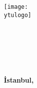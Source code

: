 \onehalfspacing
{}


\begin{titlepage}
    \begin{center}
    
        \large
        
        \textbf{\country\\ \university \\ \MakeUppercase\faculty}
        
        \texttt{[image: \\ytulogo]}

        \vspace*{1.5cm}
        \Large
        
        \parbox[][1cm][c]{1.0\textwidth}{
            \centering
            \textbf{\titleOfThesis}
        }
        
        \vspace{3cm}
        
        \textbf{\student \hspace{0.5cm} \studentno}
        \ifx\studentii\empty\else{\textbf{\\ \studentii \hspace{0.5cm} \studentiino} } \fi
        \ifx\studentiii\empty\else{\textbf{\\ \studentiii \hspace{0.5cm} \studentiiino} } \fi
        \ifx\studentiv\empty\else{\textbf{\\ \studentiv \hspace{0.5cm} \studentivno} } \fi

        
         \vfill
        
        \large
        \textbf{ \MakeUppercase\typeofThesis \\ \MakeUppercase\department}
        
        \vspace{3cm}
        
        \textbf{\advisorT\\\advisor}
        
        \ifnum{}
        \textbf{\coadvisorT\\\coadvisor}
        \fi        
        \vfill
        
        \textbf{İstanbul, \Year}
    \end{center}
\end{titlepage}


